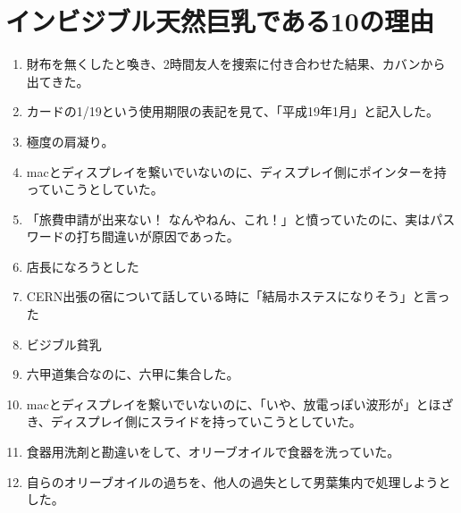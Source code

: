 \section{インビジブル天然巨乳である10の理由}
\begin{enumerate}
\item 財布を無くしたと喚き、2時間友人を捜索に付き合わせた結果、カバンから出てきた。
\item カードの1/19という使用期限の表記を見て、「平成19年1月」と記入した。
\item 極度の肩凝り。
\item macとディスプレイを繋いでいないのに、ディスプレイ側にポインターを持っていこうとしていた。
\item「旅費申請が出来ない！ なんやねん、これ！」と憤っていたのに、実はパスワードの打ち間違いが原因であった。
\item 店長になろうとした
\item CERN出張の宿について話している時に「結局ホステスになりそう」と言った
\item ビジブル貧乳
\item 六甲道集合なのに、六甲に集合した。
\item macとディスプレイを繋いでいないのに、「いや、放電っぽい波形が」とほざき、ディスプレイ側にスライドを持っていこうとしていた。
\item 食器用洗剤と勘違いをして、オリーブオイルで食器を洗っていた。
\item 自らのオリーブオイルの過ちを、他人の過失として男葉集内で処理しようとした。
\end{enumerate}

\newpage
